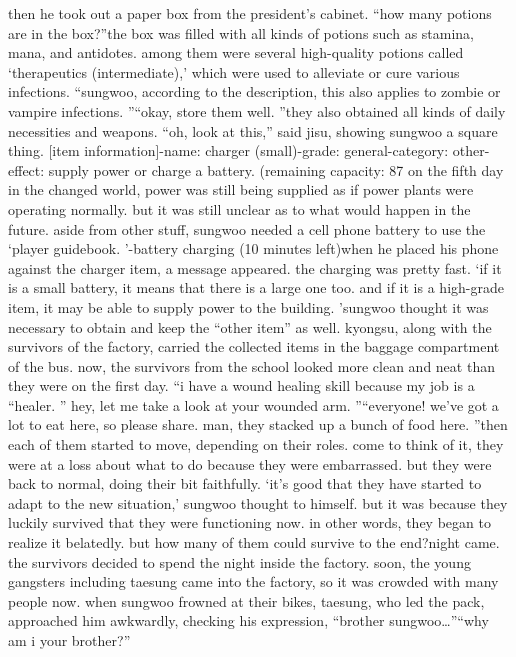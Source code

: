 then he took out a paper box from the president’s cabinet.
“how many potions are in the box?”the box was filled with all kinds of potions such as stamina, mana, and antidotes.
 among them were several high-quality potions called ‘therapeutics (intermediate),’ which were used to alleviate or cure various infections.
“sungwoo, according to the description, this also applies to zombie or vampire infections.
”“okay, store them well.
”they also obtained all kinds of daily necessities and weapons.
“oh, look at this,” said jisu, showing sungwoo a square thing.
[item information]-name: charger (small)-grade: general-category: other-effect: supply power or charge a battery.
 (remaining capacity: 87%
 on the fifth day in the changed world, power was still being supplied as if power plants were operating normally.
 but it was still unclear as to what would happen in the future.
 aside from other stuff, sungwoo needed a cell phone battery to use the ‘player guidebook.
’-battery charging (10 minutes left)when he placed his phone against the charger item, a message appeared.
 the charging was pretty fast.
‘if it is a small battery, it means that there is a large one too.
 and if it is a high-grade item, it may be able to supply power to the building.
’sungwoo thought it was necessary to obtain and keep the “other item” as well.
kyongsu, along with the survivors of the factory, carried the collected items in the baggage compartment of the bus.
 now, the survivors from the school looked more clean and neat than they were on the first day.
“i have a wound healing skill because my job is a “healer.
” hey, let me take a look at your wounded arm.
”“everyone! we’ve got a lot to eat here, so please share.
 man, they stacked up a bunch of food here.
”then each of them started to move, depending on their roles.
come to think of it, they were at a loss about what to do because they were embarrassed.
 but they were back to normal, doing their bit faithfully.
‘it’s good that they have started to adapt to the new situation,’ sungwoo thought to himself.
but it was because they luckily survived that they were functioning now.
 in other words, they began to realize it belatedly.
 but how many of them could survive to the end?night came.
 the survivors decided to spend the night inside the factory.
soon, the young gangsters including taesung came into the factory, so it was crowded with many people now.
 when sungwoo frowned at their bikes, taesung, who led the pack, approached him awkwardly, checking his expression, “brother sungwoo…”“why am i your brother?”

